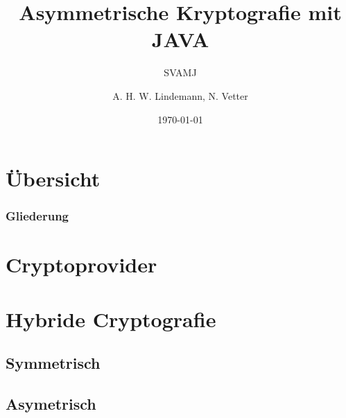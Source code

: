 \documentclass{beamer}
\title{Asymmetrische Kryptografie mit JAVA}
\subtitle{SVAMJ}
\author{A. H. W. Lindemann, N. Vetter}
\date{\today}
\institute[Universität Potsdam]{
	Institut für Informatik
}
\begin{document}
\begin{frame}

\titlepage

\end{frame}

\section{Übersicht}
\begin{frame}
\frametitle{Gliederung}
\tableofcontents
\end{frame}

\section{Cryptoprovider}
\section{}
\section{Hybride Cryptografie}
\subsection{Symmetrisch}
\subsection{Asymetrisch}
\end{document}
